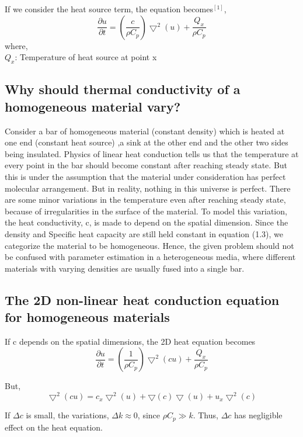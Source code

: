 \documentclass[10pt,a4paper]{report}
\begin{document}
If we consider the heat source term, the equation becomes$^{[1]}$,
\begin{equation}
\frac{\partial u}{\partial t}=(\frac{c}{\rho C_p})\bigtriangledown^2(u)+\frac{Q_x}{\rho C_p}
\end{equation}
where,\\
$Q_x$: Temperature of heat source at point x

\subsection{Why should thermal conductivity of a homogeneous material vary?}
Consider a bar of homogeneous material (constant density) which is heated at one end (constant heat source) ,a sink at the other end and the other two sides being insulated. Physics of linear heat conduction tells us that the temperature at every point in the bar should become constant after reaching steady state. But this is under the assumption that the material under consideration has perfect molecular arrangement. But in reality, nothing in this universe is perfect. There are some minor variations in the temperature even after reaching steady state, because of irregularities in the surface of the material. To model this variation, the heat conductivity, c, is made to depend on the spatial dimension. Since the density and Specific heat capacity are still held constant in equation (1.3), we categorize the material to be homogeneous.  Hence, the given problem should not be confused with parameter estimation in a heterogeneous media, where different materials with varying densities are usually fused into a single bar. 

\subsection{The 2D non-linear heat conduction equation for homogeneous materials}

If c depends on the spatial dimensions, the 2D heat equation becomes
\begin{equation}
\frac{\partial u}{\partial t}=(\frac{1}{\rho C_p})\bigtriangledown^2(cu)+\frac{Q_x}{\rho C_p}
\end{equation}

But, 
\begin{equation}
\bigtriangledown^2(cu)=c_x \bigtriangledown^2(u)+\bigtriangledown(c) \bigtriangledown(u)+u_x \bigtriangledown^2(c)
\end{equation}

If $\Delta c$ is small, the variations, $\Delta k\approx 0$, since $\rho C_p \gg k$. Thus, $\Delta c$ has negligible effect on the heat equation.
\end{document}
